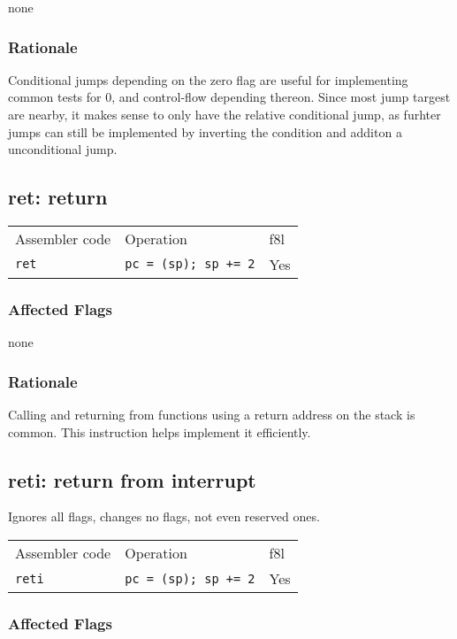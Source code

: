 \documentclass{book}
\begin{document}
none

\subsubsection*{Rationale}

Conditional jumps depending on the zero flag are useful for implementing common tests for 0, and control-flow depending thereon. Since most jump targest are nearby, it makes sense to only have the relative conditional jump, as furhter jumps can still be implemented by inverting the condition and additon a unconditional jump.


\subsection{ret: return}

\begin{tabular}{l l l}
Assembler code & Operation                   & f8l \\
\texttt{ret}   & \texttt{pc = (sp); sp += 2} & Yes \\
\end{tabular}

\subsubsection*{Affected Flags}

none

\subsubsection*{Rationale}

Calling and returning from functions using a return address on the stack is common. This instruction helps implement it efficiently.


\subsection{reti: return from interrupt}

Ignores all flags, changes no flags, not even reserved ones.

\begin{tabular}{l l l}
Assembler code  & Operation                   & f8l \\
\texttt{reti}   & \texttt{pc = (sp); sp += 2} & Yes \\
\end{tabular}

\subsubsection*{Affected Flags}
\end{document}
